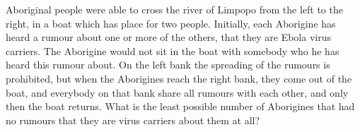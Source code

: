  Aboriginal people were able to cross the river of Limpopo from the left to the right, in a boat which has place for two people.
Initially, each Aborigine has heard a rumour about one or more of the others, that they are Ebola virus carriers.
The Aborigine would not sit in the boat with somebody who he has heard this rumour about.
On the left bank the spreading of the rumours is prohibited, but when the Aborigines reach the right bank, they come out of the boat, and everybody on that bank share all rumours with each other, and only then the boat returns.
What is the least possible number of Aborigines that had no rumours that they are virus carriers about them at all?
\solution
\endproblem
